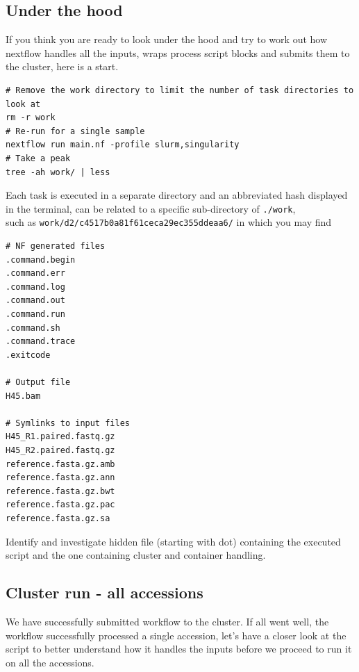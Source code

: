 \subsection{Under the hood}

If you think you are ready to look under the hood and try to work out how nextflow handles all the inputs, wraps process script blocks and submits them to the cluster, here is a start. 

\begin{bonus}
\begin{lstlisting}
# Remove the work directory to limit the number of task directories to look at
rm -r work
# Re-run for a single sample
nextflow run main.nf -profile slurm,singularity
# Take a peak
tree -ah work/ | less
\end{lstlisting}

Each task is executed in a separate directory and an abbreviated hash displayed in the terminal, can be related to a specific sub-directory of \texttt{./work},\\ such as
\texttt{work/d2/c4517b0a81f61ceca29ec355ddeaa6/} in which you may find

\begin{lstlisting}
# NF generated files
.command.begin
.command.err
.command.log
.command.out
.command.run
.command.sh
.command.trace
.exitcode

# Output file
H45.bam

# Symlinks to input files
H45_R1.paired.fastq.gz
H45_R2.paired.fastq.gz
reference.fasta.gz.amb
reference.fasta.gz.ann
reference.fasta.gz.bwt
reference.fasta.gz.pac
reference.fasta.gz.sa
\end{lstlisting}

Identify and investigate hidden file (starting with dot) containing the executed script and the one containing cluster and container handling. 

%
%

\end{bonus}


\subsection{Cluster run - all accessions}

We have successfully submitted workflow to the cluster. 
If all went well, the workflow successfully processed a single accession, 
let's have a closer look at the script to better understand how it handles 
the inputs before we proceed to run it on all the accessions.


